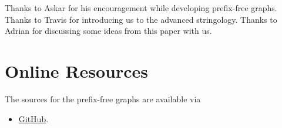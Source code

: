 \documentclass[twocolumn]{ceurart}
\begin{document}










\begin{acknowledgments}
    Thanks to Askar for his encouragement while developing prefix-free graphs.
    Thanks to Travis for introducing us to the advanced stringology.
    Thanks to Adrian for discussing some ideas from this paper with us.
\end{acknowledgments}



\appendix

\section{Online Resources}

The sources for the prefix-free graphs are available via
\begin{itemize}
\item \href{https://github.com/andynet/pfg}{GitHub}.
\end{itemize}
\end{document}

